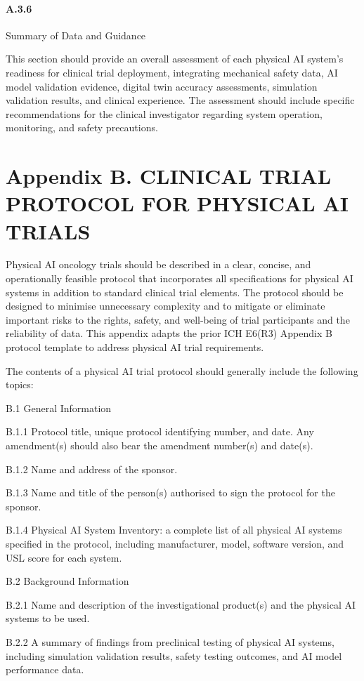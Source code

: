 \paragraph{A.3.6} Summary of Data and Guidance

This section should provide an overall assessment of each physical AI system's readiness for clinical trial deployment, integrating mechanical safety data, AI model validation evidence, digital twin accuracy assessments, simulation validation results, and clinical experience. The assessment should include specific recommendations for the clinical investigator regarding system operation, monitoring, and safety precautions.

\section{Appendix B. CLINICAL TRIAL PROTOCOL FOR PHYSICAL AI TRIALS}

Physical AI oncology trials should be described in a clear, concise, and operationally feasible protocol that incorporates all specifications for physical AI systems in addition to standard clinical trial elements. The protocol should be designed to minimise unnecessary complexity and to mitigate or eliminate important risks to the rights, safety, and well-being of trial participants and the reliability of data. This appendix adapts the prior ICH E6(R3) Appendix B protocol template to address physical AI trial requirements.

The contents of a physical AI trial protocol should generally include the following topics:

B.1 General Information

B.1.1 Protocol title, unique protocol identifying number, and date. Any amendment(s) should also bear the amendment number(s) and date(s).

B.1.2 Name and address of the sponsor.

B.1.3 Name and title of the person(s) authorised to sign the protocol for the sponsor.

B.1.4 Physical AI System Inventory: a complete list of all physical AI systems specified in the protocol, including manufacturer, model, software version, and USL score for each system.

B.2 Background Information

B.2.1 Name and description of the investigational product(s) and the physical AI systems to be used.

B.2.2 A summary of findings from preclinical testing of physical AI systems, including simulation validation results, safety testing outcomes, and AI model performance data.

